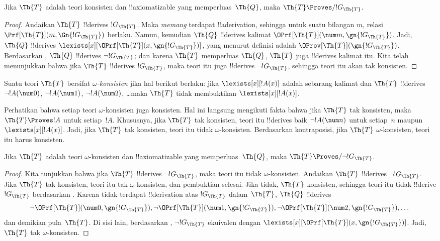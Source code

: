\documentclass[../../../include/open-logic-section]{subfiles}
\begin{document}
\begin{lem}
Jika $\Th{T}$ adalah teori konsisten dan !!{axiomatizable} yang
memperluas~$\Th{Q}$, maka $\Th{T} \Proves/ !G_\Th{T}$.
\end{lem}

\begin{proof}
Andaikan $\Th{T}$ !!{derive}s $!G_\Th{T}$. Maka \emph{memang} terdapat
!!a{derivation}, sehingga untuk suatu bilangan $m$, relasi
$\Prf[\Th{T}](m, \Gn{!G_\Th{T}})$ berlaku. Namun, kemudian $\Th{Q}$
!!{derive}s kalimat $\OPrf[\Th{T}](\num m, \gn{!G_\Th{T}})$. Jadi,
$\Th{Q}$ !!{derive}s $\lexists[x][\OPrf[\Th{T}](x,
\gn{!G_\Th{T}})]$, yang menurut definisi adalah
$\OProv[\Th{T}](\gn{!G_\Th{T}})$. Berdasarkan , $\Th{Q}$
!!{derive}s $\lnot !G_\Th{T}$; dan karena $\Th{T}$ memperluas $\Th{Q}$,
$\Th{T}$ juga !!{derive}s kalimat itu. Kita telah menunjukkan bahwa jika
$\Th{T}$ !!{derive}s $!G_\Th{T}$, maka teori itu juga !!{derive}s
$\lnot !G_\Th{T}$, sehingga teori itu akan tak konsisten.
\end{proof}

\begin{defn}
Suatu teori $\Th{T}$ bersifat \emph{$\omega$-konsisten} jika hal berikut
berlaku: jika $\lexists[x][!A(x)]$ adalah sebarang kalimat dan $\Th{T}$
!!{derive}s $\lnot !A(\num 0)$, $\lnot !A(\num 1)$,
$\lnot !A(\num 2)$, \dots maka $\Th{T}$ tidak membuktikan
$\lexists[x][!A(x)]$.
\end{defn}

Perhatikan bahwa setiap teori $\omega$-konsisten juga konsisten. Hal ini
langsung mengikuti fakta bahwa jika $\Th{T}$ tak konsisten, maka
$\Th{T} \Proves !A$ untuk setiap~$!A$. Khususnya, jika $\Th{T}$ tak
konsisten, teori itu !!{derive}s baik $\lnot !A(\num n)$ untuk setiap~$n$
maupun~$\lexists[x][!A(x)]$. Jadi, jika $\Th{T}$ tak konsisten, teori itu
tidak $\omega$-konsisten. Berdasarkan kontraposisi, jika $\Th{T}$
$\omega$-konsisten, teori itu harus konsisten.

\begin{lem}
Jika $\Th{T}$ adalah teori $\omega$-konsisten dan !!{axiomatizable} yang
memperluas~$\Th{Q}$, maka $\Th{T} \Proves/ \lnot !G_\Th{T}$.
\end{lem}

\begin{proof}
Kita tunjukkan bahwa jika $\Th{T}$ !!{derive}s $\lnot !G_\Th{T}$, maka
teori itu tidak $\omega$-konsisten. Andaikan $\Th{T}$ !!{derive}s
$\lnot !G_\Th{T}$. Jika $\Th{T}$ tak konsisten, teori itu tak
$\omega$-konsisten, dan pembuktian selesai. Jika tidak, $\Th{T}$ konsisten,
sehingga teori itu tidak !!{derive} $!G_\Th{T}$ berdasarkan
. Karena tidak terdapat !!{derivation} atas $!G_\Th{T}$
dalam~$\Th{T}$, $\Th{Q}$ !!{derive}s
\[
\lnot \OPrf[\Th{T}](\num 0, \gn{!G_\Th{T}}), \lnot \OPrf[\Th{T}](\num 1,
\gn{!G_\Th{T}}), \lnot \OPrf[\Th{T}](\num 2, \gn{!G_\Th{T}}), \dots
\]
dan demikian pula~$\Th{T}$. Di sisi lain, berdasarkan ,
$\lnot !G_\Th{T}$ ekuivalen dengan
$\lexists[x][\OPrf[\Th{T}](x,\gn{!G_\Th{T}})]$. Jadi, $\Th{T}$ tak
$\omega$-konsisten.
\end{proof}
\end{document}
